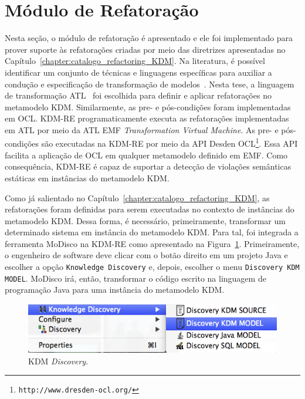 \section{Módulo de Refatoração}\label{sec:modulo_de_refatoracao_kdm_re}

Nesta seção, o módulo de refatoração é apresentado e ele foi implementado para prover suporte às refatorações criadas por meio das diretrizes apresentadas no Capítulo~\ref{chapter:catalogo_refactoring_KDM}. Na literatura, é possível identificar um conjunto de técnicas e linguagens específicas para auxiliar a condução e especificação de transformação de modelos~\cite{Biehl_2010, Mens_2006, Allilaire_06}. Nesta tese, a linguagem de transformação ATL~\cite{ATL_eclipse,Jouault_2008} foi escolhida para definir e aplicar refatorações no metamodelo KDM. Similarmente, as pre- e pós-condições foram implementadas em OCL. KDM-RE programaticamente executa as refatorações implementadas em ATL por meio da ATL EMF \textit{Transformation Virtual Machine}. As pre- e pós-condições são executadas na KDM-RE por meio da API Desden OCL\footnote{\texttt{http://www.dresden-ocl.org/}}. Essa API facilita a aplicação de OCL em qualquer metamodelo definido em EMF. Como consequência, KDM-RE é capaz de suportar a detecção de violações semânticas estáticas em instâncias do metamodelo KDM.


Como já salientado no Capítulo~\ref{chapter:catalogo_refactoring_KDM}, as refatorações foram definidas para serem executadas no contexto de instâncias do metamodelo KDM. Dessa forma, é necessário, primeiramente, transformar um determinado sistema em instância do metamodelo KDM. Para tal, foi integrada a ferramenta MoDisco na KDM-RE como apresentado na Figura~\ref{fig:kdm_modisco_discovery}. Primeiramente, o engenheiro de software deve clicar com o botão direito em um projeto Java e escolher a opção \texttt{Knowledge Discovery} e, depois, escolher o menu \texttt{Discovery KDM MODEL}. MoDisco irá, então, transformar o código escrito na linguagem de programação Java para uma instância do metamodelo KDM. 

\begin{figure}[h]
	\centering
	\caption{KDM \textit{Discovery}.}
	\label{fig:kdm_modisco_discovery}
	\includegraphics[scale=0.65]{images/kdm_discovery_kdm_re}
	\fautor
\end{figure}

